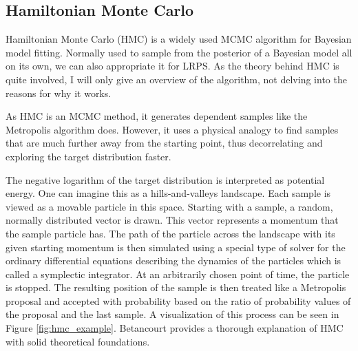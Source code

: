 \documentclass[12pt, a4paper]{report}
\begin{document}
\subsection{Hamiltonian Monte Carlo}
Hamiltonian Monte Carlo (HMC) \cite{hmc_origin} is a widely used MCMC algorithm for Bayesian model fitting.
Normally used to sample from the posterior of a Bayesian model all on its own, we can also appropriate it for LRPS.
As the theory behind HMC is quite involved, I will only give an overview of the algorithm, not delving into the reasons for why it works.

As HMC is an MCMC method, it generates dependent samples like the Metropolis algorithm does.
However, it uses a physical analogy to find samples that are much further away from the starting point, thus decorrelating and exploring the target distribution faster.

The negative logarithm of the target distribution is interpreted as potential energy.
One can imagine this as a hills-and-valleys landscape.
Each sample is viewed as a movable particle in this space.
Starting with a sample, a random, normally distributed vector is drawn.
This vector represents a momentum that the sample particle has.
The path of the particle across the landscape with its given starting momentum is then simulated using a special type of solver for the ordinary differential equations describing the dynamics of the particles which is called a symplectic integrator.
At an arbitrarily chosen point of time, the particle is stopped.
The resulting position of the sample is then treated like a Metropolis proposal and accepted with probability based on the ratio of probability values of the proposal and the last sample.
A visualization of this process can be seen in Figure \ref{fig:hmc_example}.
Betancourt \cite{hmc} provides a thorough explanation of HMC with solid theoretical foundations.
\end{document}
